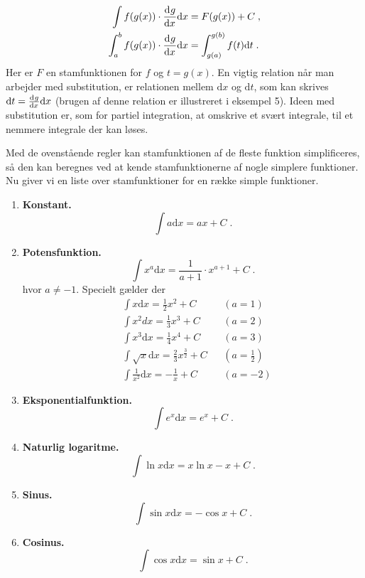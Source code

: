 \begin{enumerate}
	\begin{align*}
	\int f(g(x)) \cdot \dif{x}{g} \text{d}x &= F(g(x)) + C \; , \\
	\int_{a}^{b} f(g(x)) \cdot \dif{x}{g} \text{d}x &= \int_{g(a)}^{g(b)} f(t) \text{d}t \; .
	\end{align*}
	Her er $F$ en stamfunktionen for $f$ og $t=g(x)$. En vigtig relation når man arbejder med substitution, er relationen mellem $\text{d}x$ og $\text{d}t$, som kan skrives $\text{d}t = \dif{x}{g} \text{d}x$ (brugen af denne relation er illustreret i eksempel 5). Ideen med substitution er, som for partiel integration, at omskrive et svært integrale, til et nemmere integrale der kan løses.
\end{enumerate}

Med de ovenstående regler kan stamfunktionen af de fleste
funktion simplificeres, så den kan beregnes ved at kende
stamfunktionerne af nogle simplere funktioner. Nu giver vi en
liste over stamfunktioner for en række simple funktioner.

\begin{enumerate}[resume]
	\item\label{itm:d-konstant} \textbf{Konstant.}\\
	\[
	\int a \text{d}x = ax + C \; .
	\]
	\item\label{itm:d-potens} \textbf{Potensfunktion.}\\
	\[
	\int x^a \text{d}x = \frac{1}{a+1}\cdot x^{a+1} + C\; .
	\]
	hvor $a \neq -1$. Specielt gælder der
	\begin{align*}
	&\int x \text{d}x = \frac{1}{2} x^2 + C&&(a=1)\\
	&\int x^2 dx = \frac{1}{3} x^3 + C&&(a=2)\\
	&\int x^3 \text{d}x = \frac{1}{4} x^4 + C &&(a=3)\\
	&\int \sqrt{x} \text{d}x = \frac{2}{3} x^{\frac{3}{2}} + C &&(a=\tfrac{1}{2})\\
	&\int \frac{1}{x^2} \text{d}x = - \frac{1}{x} + C &&(a=-2)
	\end{align*}
	\item\label{itm:d-exp} \textbf{Eksponentialfunktion.}\\
	\[
	\int e^x \text{d}x = e^x + C \; .
	\]
	\item\label{itm:d-ln} \textbf{Naturlig logaritme.}\\
	\[
	\int \ln x \text{d}x = x\ln x - x + C \; .
	\]
	\item\label{itm:d-sin} \textbf{Sinus.}\\
	\[
	\int \sin x \text{d}x = -\cos x  + C\; .
	\]
	\item\label{itm:d-cos} \textbf{Cosinus.}\\
	\[
	\int \cos x \text{d}x = \sin x + C\; .
	\]
\end{enumerate}

